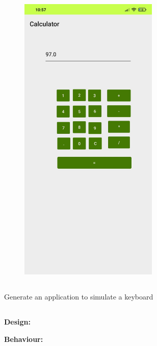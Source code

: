 \documentclass[12pt,letterpaper]{article}
\begin{document}
\begin{figure}
    \centering
    \includegraphics[height=14cm, keepaspectratio]{Calculator/Outputs/OP3.png}
\end{figure}

\newpage

\subsection*{}
\begin{flushleft}
    Generate an application to simulate a keyboard  
\end{flushleft}

\subsection*{}

\subsubsection*{}
\textbf{Design:}
\begin{flushleft}

\end{flushleft}
\textbf{Behaviour:}
\begin{flushleft}

\end{flushleft}
\end{document}
